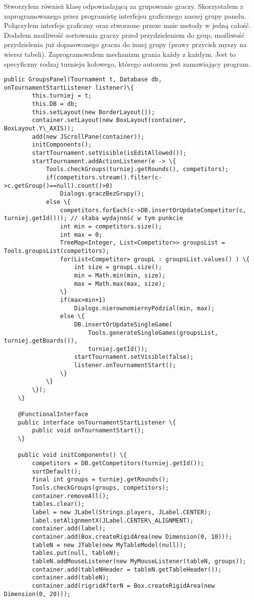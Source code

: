 Stworzyłem również klasę odpowiadającą za grupowanie graczy. Skorzystałem z zaprogramowanego przez programistę interfejsu graficznego naszej grupy panelu. Połączyłem interfejs graficzny oraz stworzone przeze mnie metody w jedną całość. Dodałem możliwość sortowania graczy przed przydzieleniem do grup, możliwość przydzielenia już dopasowanego gracza do innej grupy (prawy przycisk myszy na wiersz tabeli). Zaprogramowałem mechanizm grania każdy z każdym. Jest to specyficzny rodzaj turnieju kołowego, którego autorem jest zamawiający program.
\begin{verbatim}
public GroupsPanel(Tournament t, Database db, onTournamentStartListener listener)\{
		this.turniej = t;
		this.DB = db;
		this.setLayout(new BorderLayout());
		container.setLayout(new BoxLayout(container, BoxLayout.Y\_AXIS));
		add(new JScrollPane(container));
		initComponents();
		startTournament.setVisible(isEditAllowed());
		startTournament.addActionListener(e -> \{
			Tools.checkGroups(turniej.getRounds(), competitors);
			if(competitors.stream().filter(c->c.getGroup()==null).count()>0)
				Dialogs.graczBezGrupy();
			else \{
				competitors.forEach(c->DB.insertOrUpdateCompetitor(c, turniej.getId())); // słaba wydajność w tym punkcie
				int min = competitors.size();
				int max = 0;
				TreeMap<Integer, List<Competitor>> groupsList = Tools.groupsList(competitors);
				for(List<Competitor> groupL : groupsList.values() ) \{
					int size = groupL.size();
					min = Math.min(min, size);
					max = Math.max(max, size);
				\}
				if(max>min+1)
					Dialogs.nierownomiernyPodzial(min, max);
				else \{
					DB.insertOrUpdateSingleGame(
						Tools.generateSingleGames(groupsList, turniej.getBoards()), 
						turniej.getId());
					startTournament.setVisible(false);
					listener.onTournamentStart();
				\}
			\}		
		\});
	\}
	
	@FunctionalInterface 
	public interface onTournamentStartListener \{
		public void onTournamentStart();
	\}
	
	public void initComponents() \{
		competitors = DB.getCompetitors(turniej.getId());
		sortDefault();
		final int groups = turniej.getRounds();
		Tools.checkGroups(groups, competitors);
		container.removeAll();
		tables.clear();
		label = new JLabel(Strings.players, JLabel.CENTER);
		label.setAlignmentX(JLabel.CENTER\_ALIGNMENT);
		container.add(label);
		container.add(Box.createRigidArea(new Dimension(0, 10)));
		tableN = new JTable(new MyTableModel(null));
		tables.put(null, tableN);
		tableN.addMouseListener(new MyMouseListener(tableN, groups));
        container.add(tableNHeader = tableN.getTableHeader());
        container.add(tableN);
        container.add(rigridAfterN = Box.createRigidArea(new Dimension(0, 20)));
        

\end{verbatim}
